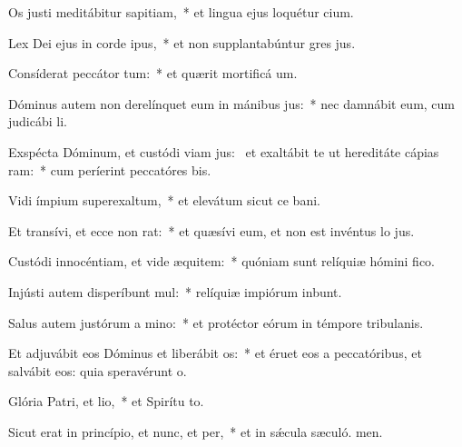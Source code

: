 \item Os justi meditábitur sapitiam,~* et lingua ejus loquétur cium.
\item Lex Dei ejus in corde ipus,~* et non supplantabúntur gres jus.
\item Consíderat peccátor tum:~* et quærit mortificá um.
\item Dóminus autem non derelínquet eum in mánibus jus:~* nec damnábit eum, cum judicábi li.
\item Exspécta Dóminum, et custódi viam jus:~\pscross{} et exaltábit te ut hereditáte cápias ram:~* cum períerint peccatóres bis.
\item Vidi ímpium superexaltum,~* et elevátum sicut ce bani.
\item Et transívi, et ecce non rat:~* et quæsívi eum, et non est invéntus lo jus.
\item Custódi innocéntiam, et vide æquitem:~* quóniam sunt relíquiæ hómini fico.
\item Injústi autem disperíbunt mul:~* relíquiæ impiórum inbunt.
\item Salus autem justórum a mino:~* et protéctor eórum in témpore tribulanis.
\item Et adjuvábit eos Dóminus et liberábit os:~* et éruet eos a peccatóribus, et salvábit eos: quia speravérunt  o.
\item Glória Patri, et lio,~* et Spirítu to.
\item Sicut erat in princípio, et nunc, et per,~* et in sǽcula sæculó. men.
